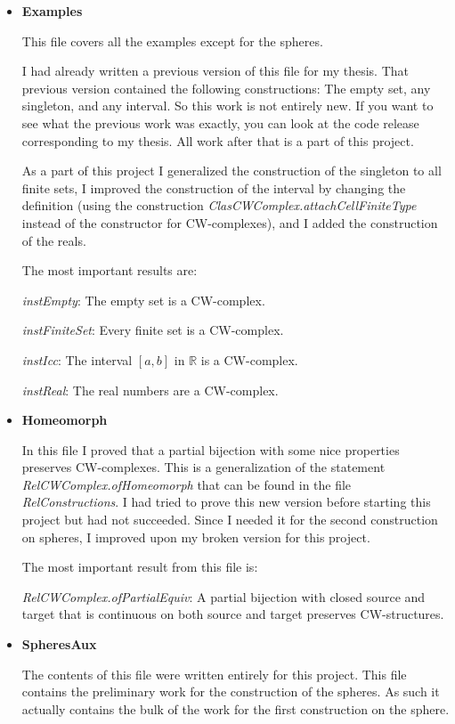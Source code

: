 \documentclass[11pt,a4paper]{article}
\def\R{\mathbb{R}}
\begin{document}
\begin{itemize}
    \item \textbf{Examples}

This file covers all the examples except for the spheres.

I had already written a previous version of this file for my thesis.
That previous version contained the following constructions: 
The empty set, any singleton, and any interval.
So this work is not entirely new. 
If you want to see what the previous work was exactly, 
you can look at the code release corresponding to my thesis. 
All work after that is a part of this project.

As a part of this project I generalized the construction of the singleton to all finite sets, 
I improved the construction of the interval by changing the definition 
(using the construction \emph{ClasCWComplex.attachCellFiniteType} instead of the constructor for CW-complexes), 
and I added the construction of the reals.

The most important results are: 

\emph{instEmpty}: The empty set is a CW-complex.

\emph{instFiniteSet}: Every finite set is a CW-complex.

\emph{instIcc}: The interval $[a, b]$ in $\R$ is a CW-complex.

\emph{instReal}: The real numbers are a CW-complex.

    \item \textbf{Homeomorph}

In this file I proved that a partial bijection with some nice properties preserves CW-complexes. 
This is a generalization of the statement \emph{RelCWComplex.ofHomeomorph} that can be found in the 
file \emph{RelConstructions}. 
I had tried to prove this new version before starting this project but had not succeeded. 
Since I needed it for the second construction on spheres, 
I improved upon my broken version for this project. 

The most important result from this file is: 

\emph{RelCWComplex.ofPartialEquiv}: A partial bijection with closed source and target that is
continuous on both source and target preserves CW-structures.

    \item \textbf{SpheresAux}

The contents of this file were written entirely for this project. 
This file contains the preliminary work for the construction of the spheres. 
As such it actually contains the bulk of the work for the first construction on the sphere. 


\end{itemize}
\end{document}
